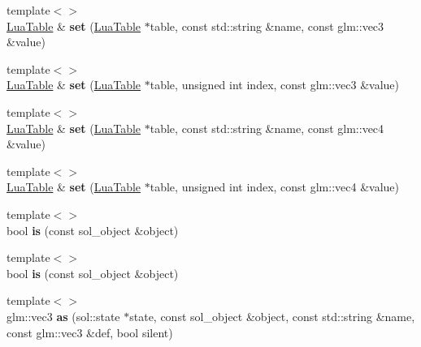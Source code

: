 \begin{DoxyCompactItemize}
{\footnotesize template$<$$>$ }\\\hyperlink{classTarbora_1_1LuaTable}{Lua\+Table} \& {\bfseries set} (\hyperlink{classTarbora_1_1LuaTable}{Lua\+Table} $\ast$table, const std\+::string \&name, const glm\+::vec3 \&value)
\item 
\mbox{\label{classTarbora_1_1LuaType_abb45a2d31f9542a033643f9229d8079b}} 
{\footnotesize template$<$$>$ }\\\hyperlink{classTarbora_1_1LuaTable}{Lua\+Table} \& {\bfseries set} (\hyperlink{classTarbora_1_1LuaTable}{Lua\+Table} $\ast$table, unsigned int index, const glm\+::vec3 \&value)
\item 
\mbox{\label{classTarbora_1_1LuaType_af0a134157eecd8644a03d1aaa1fe8e1d}} 
{\footnotesize template$<$$>$ }\\\hyperlink{classTarbora_1_1LuaTable}{Lua\+Table} \& {\bfseries set} (\hyperlink{classTarbora_1_1LuaTable}{Lua\+Table} $\ast$table, const std\+::string \&name, const glm\+::vec4 \&value)
\item 
\mbox{\label{classTarbora_1_1LuaType_a68a57817faa802554f4d8b409f9941be}} 
{\footnotesize template$<$$>$ }\\\hyperlink{classTarbora_1_1LuaTable}{Lua\+Table} \& {\bfseries set} (\hyperlink{classTarbora_1_1LuaTable}{Lua\+Table} $\ast$table, unsigned int index, const glm\+::vec4 \&value)
\item 
\mbox{\label{classTarbora_1_1LuaType_a870f2c458feb5998b6719339507e2c30}} 
{\footnotesize template$<$$>$ }\\bool {\bfseries is} (const sol\+\_\+object \&object)
\item 
\mbox{\label{classTarbora_1_1LuaType_af81504f5cff83d2689e6e6262677e89c}} 
{\footnotesize template$<$$>$ }\\bool {\bfseries is} (const sol\+\_\+object \&object)
\item 
\mbox{\label{classTarbora_1_1LuaType_a9be3fc39caf5a883d7bed8107fbae700}} 
{\footnotesize template$<$$>$ }\\glm\+::vec3 {\bfseries as} (sol\+::state $\ast$state, const sol\+\_\+object \&object, const std\+::string \&name, const glm\+::vec3 \&def, bool silent)

\end{DoxyCompactItemize}
